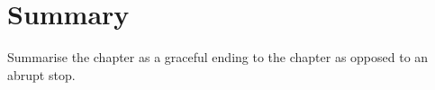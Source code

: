 
\section{Summary}
\label{chpLitReview-secSummary}

Summarise the chapter as a graceful ending to the chapter as opposed to an abrupt stop.


